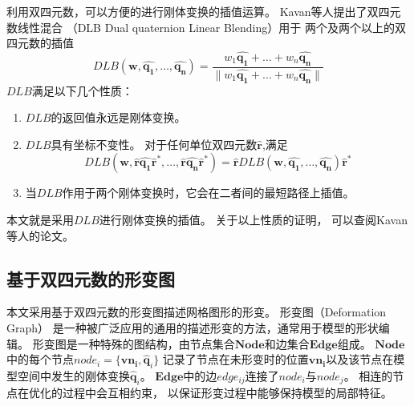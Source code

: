 利用双四元数，可以方便的进行刚体变换的插值运算。
Kavan等人\cite{kavan2006dual}提出了双四元数线性混合
（DLB  Dual quaternion Linear Blending）用于
两个及两个以上的双四元数的插值
\begin{equation}
    DLB(\bm{w},\hat{\bm{q_1}},\ldots,\hat{\bm{q_n}}) = 
    \frac{
            w_1\hat{\bm{q_1}} + \ldots + w_n\hat{\bm{q_n}}
        }
        {
            \| w_1\hat{\bm{q_1}} + \ldots + w_n\hat{\bm{q_n}}\|
        }
\end{equation}
$DLB$满足以下几个性质：
\begin{enumerate}
    \item  $DLB$的返回值永远是刚体变换。
    \item  $DLB$具有坐标不变性。
           对于任何单位双四元数$\hat{\bm{r}}$,满足
           \begin{equation}
                DLB(\bm{w},\hat{\bm{r}}\hat{\bm{q_1}}\hat{\bm{r}}^*,
                \ldots , 
                \hat{\bm{r}}\hat{\bm{q_n}}\hat{\bm{r}}^*)
                =
                \hat{\bm{r}}DLB(\bm{w},\hat{\bm{q_1}},\ldots,\hat{\bm{q_n}})\hat{\bm{r}}^*
           \end{equation}
    \item  当$DLB$作用于两个刚体变换时，它会在二者间的最短路径上插值。
\end{enumerate}
本文就是采用$DLB$进行刚体变换的插值。
关于以上性质的证明，
可以查阅Kavan等人\cite{kavan2006dual}的论文。

\subsection{基于双四元数的形变图}
本文采用基于双四元数的形变图描述网格图形的形变。
形变图（Deformation Graph）\cite{sumner2007embedded}
是一种被广泛应用的通用的描述形变的方法，通常用于模型的形状编辑。
形变图是一种特殊的图结构，由节点集合$\bm{Node}$和边集合$\bm{Edge}$组成。
$\bm{Node}$中的每个节点$node_i = \{\bm{vn_i}, \hat{\bm{q}}_i\}$
记录了节点在未形变时的位置$\bm{vn_i}$以及该节点在模型空间中发生的刚体变换$\hat{\bm{q}}_i$。
$\bm{Edge}$中的边$edge_{ij}$连接了$node_i$与$node_{j}$。
相连的节点在优化的过程中会互相约束，
以保证形变过程中能够保持模型的局部特征。

